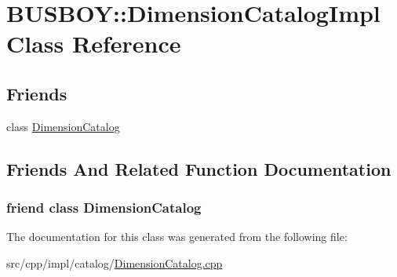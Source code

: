 \hypertarget{classBUSBOY_1_1DimensionCatalogImpl}{
\section{BUSBOY::DimensionCatalogImpl Class Reference}
\label{classBUSBOY_1_1DimensionCatalogImpl}
}
\subsection*{Friends}
\begin{DoxyCompactItemize}
\item 
class \hyperlink{classBUSBOY_1_1DimensionCatalogImpl_a07d391cd59ddab05b24a2874c767faa6}{DimensionCatalog}
\end{DoxyCompactItemize}


\subsection{Friends And Related Function Documentation}
\hypertarget{classBUSBOY_1_1DimensionCatalogImpl_a07d391cd59ddab05b24a2874c767faa6}{
\subsubsection[{DimensionCatalog}]{\setlength{\rightskip}{0pt plus 5cm}friend class {\bf DimensionCatalog}}}
\label{classBUSBOY_1_1DimensionCatalogImpl_a07d391cd59ddab05b24a2874c767faa6}


The documentation for this class was generated from the following file:\begin{DoxyCompactItemize}
\item 
src/cpp/impl/catalog/\hyperlink{DimensionCatalog_8cpp}{DimensionCatalog.cpp}\end{DoxyCompactItemize}
